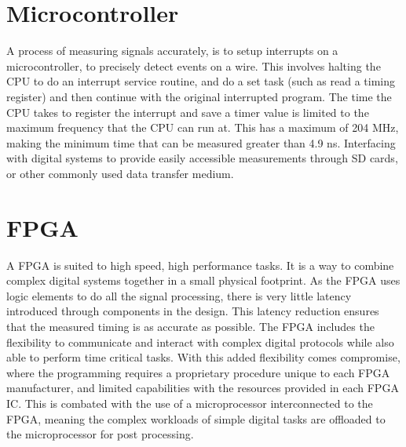 \section{Microcontroller}

A process of measuring signals accurately, is to setup interrupts on a microcontroller, to precisely detect events 
on a wire.  This involves halting the CPU to do an interrupt service routine, and do a set task (such as read a 
timing register) and then continue with the original interrupted program. The time the CPU takes to register the 
interrupt and save a timer value is limited to the maximum frequency that the CPU can run at. This has a maximum of 
204 MHz, making the minimum time that can be measured greater than 4.9 ns. Interfacing with digital systems to 
provide easily accessible measurements through SD cards, or other commonly used data transfer medium.

\section{FPGA}

A FPGA is suited to high speed, high performance tasks. It is a way to combine complex digital systems together in 
a small physical footprint. As the FPGA uses logic elements to do all the signal processing, there is very little 
latency introduced through components in the design. This latency reduction ensures that the measured timing is as 
accurate as possible. The FPGA includes the flexibility to communicate and interact with complex digital protocols 
while also able to perform time critical tasks. With this added flexibility comes compromise, where the programming 
requires a proprietary procedure unique to each FPGA manufacturer, and limited capabilities with the resources 
provided in each FPGA IC. This is combated with the use of a microprocessor interconnected to the FPGA, meaning the 
complex workloads of simple digital tasks are offloaded to the microprocessor for post processing.

